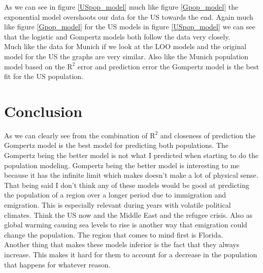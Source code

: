 \documentclass[english]{article}
\newcommand{\pop}{population }
\begin{document}
As we can see in figure \ref{USpop_model} much like figure \ref{Gpop_model} the exponential model overshoots our data for the US towards the end. Again much like figure \ref{Gpop_model} for the US models in figure \ref{USpop_model} we can see that the logistic and Gompertz models both follow the data very closely.\\

Much like the data for Munich if we look at the LOO models and the original model for the US the graphs are very similar. Also like the Munich \pop model based on the $\text{R}^2 $ error and prediction error the Gompertz model is the best fit for the US population.



\section{Conclusion}

As we can clearly see from the combination of $ \text{R}^2 $ and closeness of prediction the Gompertz model is the best model for predicting both populations. The Gompertz being the better model is not what I predicted when starting to do the population modeling. Gompertz being the better model is interesting to me because it has the infinite limit which makes doesn't make a lot of physical sense. \\

That being said I don't think any of these models would be good at predicting the \pop of a region over a longer period due to immigration and emigration. This is especially relevant during years with volatile political climates. Think the US now and the Middle East and the refugee crisis. Also as global warming causing sea levels to rise is another way that emigration could change the population. The region that comes to mind first is Florida. \\

Another thing that makes these models inferior is the fact that they always increase. This makes it hard for them to account for a decrease in the population that happens for whatever reason.





\end{document}
